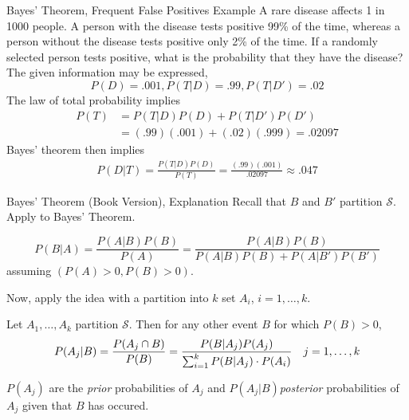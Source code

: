 \documentclass[handout]{beamer}
\newcommand{\nl}[1]{\vspace{#1 em}}
\begin{document}
        \begin{frame}{Bayes' Theorem, Frequent False Positives Example}
            A rare disease affects 1 in 1000 people. A person with the disease tests positive 99\% of the time, whereas a person without the disease tests positive only 2\% of the time. If a randomly selected person tests positive, what is the probability that they have the disease?\\
            \nl{0.5}
            \pause The given information may be expressed,
            $$P(D) = .001, P(T|D)=.99, P(T|D')=.02$$
            The law of total probability implies
            \begin{align*}
            P(T) &= P(T|D)P(D)+P(T|D')P(D') \\
            &= (.99)(.001)+(.02)(.999) = .02097
            \end{align*}
            Bayes' theorem then implies
            \begin{align*}
            P(D|T) = \frac{P(T|D)P(D)}{P(T)}
            = \frac{(.99)(.001)}{.02097} \approx .047
            \end{align*}
    \end{frame}

    \begin{frame}{Bayes' Theorem (Book Version), Explanation}
    Recall that $B$ and $B'$ partition $\mathcal{S}$. Apply to Bayes' Theorem.
    \begin{block}{}
    $$P(B|A) = \frac{P(A|B)P(B)}{P(A)} = \frac{P(A|B)P(B)}{P(A|B)P(B) + P(A|B')P(B')} $$
    assuming $(\text{$P(A)>0, P(B)>0$})$.
        \end{block}{}
    \pause Now, apply the idea with a partition into $k$ set $A_i$, $i=1,\ldots,k$.
    \begin{block}{}
        Let $A_1, \ldots, A_k$ partition $\mathcal{S}$. Then for any other event $B$ for which $P(B)>0$,
        $$ P(A_j|B) = \frac{P(A_j\cap B)}{P(B)} = \frac{P(B|A_j)P(A_j)}{\sum_{i=1}^k P(B|A_j)\cdot P(A_i)} \hskip 1em j = 1, \ldots, k$$
    \end{block}{}
    \pause $P(A_j)$ are the \textit{prior} probabilities of $A_j$ and $P(A_j|B)$\textit{posterior} probabilities of $A_j$ given that $B$ has occured.
    \end{frame}
\end{document}
